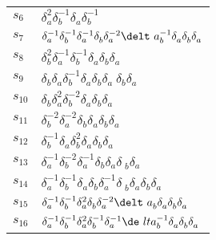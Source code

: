 \documentclass{article}
\begin{document}
\begin{center}
\begin{tabular}{ll}
$s_{6}$ & $\delta_a^{2}\delta_b^{-1}\delta_a^{}\delta_b^{-1}$ \\
$s_{7}$ & $\delta_a^{-1}\delta_b^{-1}\delta_a^{-1}\delta_b^{}\delta_a^{-2}\delt\
a_b^{-1}\delta_a^{}\delta_b^{}\delta_a^{}$ \\
$s_{8}$ & $\delta_b^{2}\delta_a^{-1}\delta_b^{-1}\delta_a^{}\delta_b^{}\delta_a\
^{}$ \\
$s_{9}$ & $\delta_b^{}\delta_a^{}\delta_b^{-1}\delta_a^{}\delta_b^{}\delta_a^{}\
\delta_b^{}\delta_a^{}$ \\
$s_{10}$ & $\delta_b^{}\delta_a^{2}\delta_b^{-2}\delta_a^{}\delta_b^{}\delta_a^\
{}$ \\
$s_{11}$ & $\delta_b^{-2}\delta_a^{-2}\delta_b^{}\delta_a^{}\delta_b^{}\delta_a\
^{}$ \\
$s_{12}$ & $\delta_b^{-1}\delta_a^{}\delta_b^{2}\delta_a^{}\delta_b^{}\delta_a^\
{}$ \\
$s_{13}$ & $\delta_a^{-1}\delta_b^{-2}\delta_a^{-1}\delta_b^{}\delta_a^{}\delta\
_b^{}\delta_a^{}$ \\
$s_{14}$ & $\delta_a^{-1}\delta_b^{-1}\delta_a^{}\delta_b^{}\delta_a^{-1}\delta\
_b^{}\delta_a^{}\delta_b^{}\delta_a^{}$ \\
$s_{15}$ & $\delta_a^{-1}\delta_b^{-1}\delta_a^{2}\delta_b^{}\delta_a^{-2}\delt\
a_b^{}\delta_a^{}\delta_b^{}\delta_a^{}$ \\
$s_{16}$ & $\delta_a^{-1}\delta_b^{-1}\delta_a^{2}\delta_b^{-1}\delta_a^{-1}\de\
lta_b^{-1}\delta_a^{}\delta_b^{}\delta_a^{}$ \\
\bottomrule
\end{tabular}
\end{center}

\thispagestyle{empty}
\end{document}
